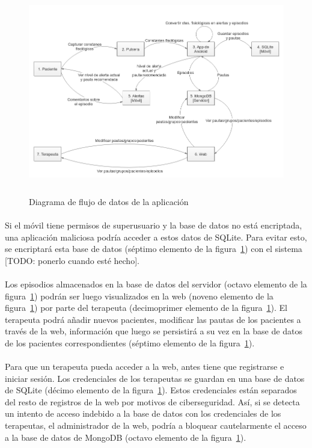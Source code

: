 \begin{figure}[H]
    \centering
    \includegraphics[height=9cm, width=\textwidth]{Imagenes/04DescProblema/dfd-all.png}
    \caption[Diagrama de flujo de datos de la aplicación]{Diagrama de flujo de datos de la aplicación}
    \label{c4:fig:dfd}
\end{figure}

\paragraph{}
Si el móvil tiene permisos de superusuario y la base de datos no está encriptada, una aplicación maliciosa podría acceder a estos datos de SQLite. Para evitar esto, se encriptará esta base de datos (séptimo elemento de la figura~\ref{c4:fig:dfd}) con el sistema [TODO: ponerlo cuando esté hecho].

\paragraph{}
Los episodios almacenados en la base de datos del servidor (octavo elemento de la figura~\ref{c4:fig:dfd}) podrán ser luego visualizados en la web (noveno elemento de la figura~\ref{c4:fig:dfd}) por parte del terapeuta (decimoprimer elemento de la figura~\ref{c4:fig:dfd}). El terapeuta podrá añadir nuevos pacientes, modificar las pautas de los pacientes a través de la web, información que luego se persistirá a su vez en la base de datos de los pacientes correspondientes (séptimo elemento de la figura~\ref{c4:fig:dfd}).

\paragraph{}
Para que un terapeuta pueda acceder a la web, antes tiene que registrarse e iniciar sesión. Los credenciales de los terapeutas se guardan en una base de datos de SQLite (décimo elemento de la figura~\ref{c4:fig:dfd}). Estos credenciales están separados del resto de registros de la web por motivos de ciberseguridad. Así, si se detecta un intento de acceso indebido a la base de datos con los credenciales de los terapeutas, el administrador de la web, podría a bloquear cautelarmente el acceso a la base de datos de MongoDB (octavo elemento de la figura~\ref{c4:fig:dfd}).

